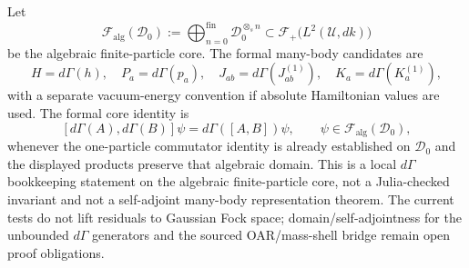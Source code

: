 Let
\[
  \mathcal F_{\mathrm{alg}}(\mathcal D_0)
  :=
  \bigoplus_{n=0}^{\mathrm{fin}}\mathcal D_0^{\otimes_s n}
  \subset \mathcal F_+\bigl(L^2(\mathcal U,dk)\bigr)
\]
be the algebraic finite-particle core.  The formal many-body candidates are
\[
  H=d\Gamma(h),\quad
  P_a=d\Gamma(p_a),\quad
  J_{ab}=d\Gamma(J_{ab}^{(1)}),\quad
  K_a=d\Gamma(K_a^{(1)}),
\]
with a separate vacuum-energy convention if absolute Hamiltonian values are
used.  The formal core identity is
\[
  [d\Gamma(A),d\Gamma(B)]\psi=d\Gamma([A,B])\psi,
  \qquad \psi\in\mathcal F_{\mathrm{alg}}(\mathcal D_0),
\]
whenever the one-particle commutator identity is already established on
\(\mathcal D_0\) and the displayed products preserve that algebraic domain.
This is a local \(d\Gamma\) bookkeeping statement on the algebraic
finite-particle core, not a Julia-checked invariant and not a self-adjoint
many-body representation theorem.  The current tests do not lift residuals to
Gaussian Fock space; domain/self-adjointness for the unbounded \(d\Gamma\)
generators and the sourced OAR/mass-shell bridge remain open proof obligations.
